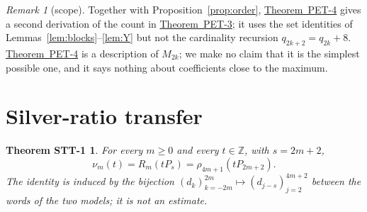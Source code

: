 \documentclass[11pt]{amsart}
\theoremstyle{definition}
\theoremstyle{remark}
\newtheorem{remark}[lemma]{Remark}
\theoremstyle{plain}
\newtheorem*{thmSTTone}{Theorem STT-1}
\numberwithin{equation}{section}
\newcommand{\Z}{\mathbb{Z}}
\newcommand{\PETthree}{\hyperref[thm:pet3]{Theorem~PET-3}}
\newcommand{\PETfour}{\hyperref[thm:pet4]{Theorem~PET-4}}
\begin{document}
\begin{remark}[scope]\label{rem:scope4}
Together with Proposition~\ref{prop:order}, \PETfour{} gives a second derivation of the count in
\PETthree; it uses the set identities of Lemmas~\ref{lem:blocks}--\ref{lem:Y} but not the cardinality
recursion $q_{2k+2}=q_{2k}+8$. \PETfour{} is a description of $M_{2k}$; we make no claim that it is
the simplest possible one, and it says nothing about coefficients close to the maximum.
\end{remark}

\section{Silver-ratio transfer}\label{sec:stt1}

\begin{thmSTTone}\label{thm:stt1}
For every $m\ge0$ and every $t\in\Z$, with $s=2m+2$,
\[
\nu_m(t)=R_m(tP_s)=\rho_{4m+1}(tP_{2m+2}).
\]
The identity is induced by the bijection $(d_k)_{k=-2m}^{2m}\mapsto(d_{j-s})_{j=2}^{4m+2}$ between the
words of the two models; it is not an estimate.
\end{thmSTTone}
\end{document}
